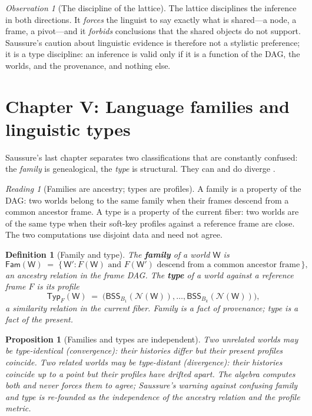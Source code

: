 \documentclass[11pt,a4paper]{article}
\newtheorem{definition}[principle]{Definition}
\newtheorem{proposition}[principle]{Proposition}
\theoremstyle{remark}
\newtheorem{observation}[principle]{Observation}
\newtheorem{reading}[principle]{Reading}
\newcommand{\BSS}{\ensuremath{\mathsf{BSS}}}             %
\newcommand{\World}{\ensuremath{\mathsf{W}}}             %
\newcommand{\Fam}{\ensuremath{\mathsf{Fam}}}             %
\newcommand{\Typ}{\ensuremath{\mathsf{Typ}}}             %
\begin{document}
\begin{observation}[The discipline of the lattice]
\label{obs:discipline}
The lattice disciplines the inference in both directions. It \emph{forces}
the linguist to say exactly what is shared---a node, a frame, a pivot---and
it \emph{forbids} conclusions that the shared objects do not support.
Saussure's caution about linguistic evidence is therefore not a stylistic
preference; it is a type discipline: an inference is valid only if it is a
function of the DAG, the worlds, and the provenance, and nothing else.
\end{observation}

\section{Chapter V: Language families and linguistic types}
\label{sec:ch5}

Saussure's last chapter separates two classifications that are constantly
confused: the \emph{family} is genealogical, the \emph{type} is structural.
They can and do diverge \cite[Part V, ch.~V]{harris1983}.

\begin{reading}[Families are ancestry; types are profiles]
\label{read:family-type}
A family is a property of the DAG: two worlds belong to the same family when
their frames descend from a common ancestor frame. A type is a property of
the current fiber: two worlds are of the same type when their soft-key
profiles against a reference frame are close. The two computations use
disjoint data and need not agree.
\end{reading}

\begin{definition}[Family and type]
\label{def:family-type}
The \textbf{family} of a world $\World$ is
\[
  \Fam(\World) \;=\;\{\,\World' : F(\World) \text{ and } F(\World')
  \text{ descend from a common ancestor frame}\,\},
\]
an ancestry relation in the frame DAG. The \textbf{type} of a world against
a reference frame $F$ is its profile
\[
  \Typ_F(\World) \;=\;\bigl(\BSS_{B_1}(\mathcal{N}(\World)),\dots,
  \BSS_{B_k}(\mathcal{N}(\World))\bigr),
\]
a similarity relation in the current fiber. Family is a fact of provenance;
type is a fact of the present.
\end{definition}

\begin{proposition}[Families and types are independent]
\label{prop:family-type}
Two unrelated worlds may be type-identical (convergence): their histories
differ but their present profiles coincide. Two related worlds may be
type-distant (divergence): their histories coincide up to a point but their
profiles have drifted apart. The algebra computes both and never forces them
to agree; Saussure's warning against confusing family and type is re-founded
as the independence of the ancestry relation and the profile metric.
\end{proposition}
\end{document}
